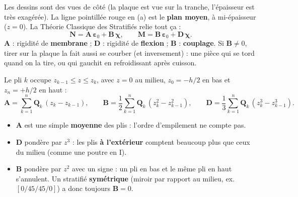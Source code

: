 \documentclass[11pt,a4paper]{article}
\newcommand{\Q}{\mathbf{Q}}
\begin{document}
Les dessins sont des vues de côté (la plaque est vue sur la tranche,
l'épaisseur est très exagérée). La ligne pointillée rouge en (a) est le
\textbf{plan moyen}, à mi-épaisseur ($z = 0$).
La Théorie Classique des Stratifiés relie tout ça :
\[
\mathbf{N} = \mathbf{A}\,\boldsymbol{\varepsilon}_0 + \mathbf{B}\,\boldsymbol{\chi},
\qquad
\mathbf{M} = \mathbf{B}\,\boldsymbol{\varepsilon}_0 + \mathbf{D}\,\boldsymbol{\chi}.
\]
$\mathbf{A}$ : rigidité de \textbf{membrane} ; $\mathbf{D}$ : rigidité de
\textbf{flexion} ; $\mathbf{B}$ : \textbf{couplage}. Si $\mathbf{B}\neq0$,
tirer sur la plaque la fait aussi se courber (et inversement) : une pièce qui
se tord quand on la tire, ou qui gauchit en refroidissant après cuisson.

Le pli $k$ occupe $z_{k-1} \le z \le z_k$, avec $z=0$ au milieu,
$z_0 = -h/2$ en bas et $z_n = +h/2$ en haut :
\[
\mathbf{A} = \sum_{k=1}^{n} \Q_k\,(z_k - z_{k-1}),
\qquad
\mathbf{B} = \frac12\sum_{k=1}^{n} \Q_k\,(z_k^2 - z_{k-1}^2),
\qquad
\mathbf{D} = \frac13\sum_{k=1}^{n} \Q_k\,(z_k^3 - z_{k-1}^3).
\]

\begin{center}
\end{center}

\begin{idee}[Intuition]
\begin{itemize}
  \item $\mathbf{A}$ est une simple \textbf{moyenne} des plis : l'ordre
        d'empilement ne compte pas.
  \item $\mathbf{D}$ pondère par $z^3$ : les plis \textbf{à l'extérieur}
        comptent beaucoup plus que ceux du milieu (comme une poutre en I).
  \item $\mathbf{B}$ pondère par $z^2$ avec un signe : un pli en bas et le
        même pli en haut s'annulent. Un stratifié \textbf{symétrique}
        (miroir par rapport au milieu, ex. $[0/45/45/0]$) a donc toujours
        $\mathbf{B}=0$.
\end{itemize}
\end{idee}
\end{document}
